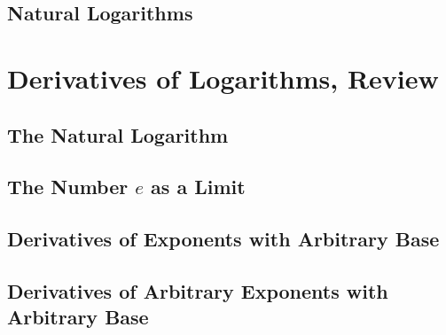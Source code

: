 \documentclass%
[handout]%
{beamer}
\begin{document}
{\subsection{Natural Logarithms}


%
%
\section{Derivatives of Logarithms, Review}
\subsection{The Natural Logarithm}


\subsection{The Number $e$ as a Limit}


\subsection{Derivatives of Exponents with Arbitrary Base}


\subsection{Derivatives of Arbitrary Exponents with Arbitrary Base}


} %
\end{document}
